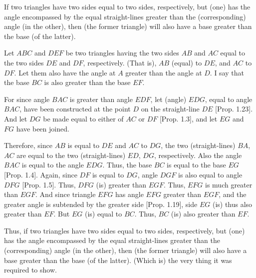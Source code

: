 \begin{Parallel}{}{}
{If two triangles have two sides equal to two sides, respectively,
but (one) has the angle encompassed by the equal straight-lines greater than the (corresponding)
angle (in the other), then (the former triangle) will also have a base greater than the base (of the latter).

\epsfysize=2in
\centerline{}

Let  $ABC$ and $DEF$ be two triangles having the two sides $AB$ and $AC$
equal to the two sides $DE$ and $DF$, respectively. (That is), $AB$ (equal) to $DE$, and
$AC$ to $DF$.  Let them also have the angle at $A$ greater than the angle at $D$.
I say that the base $BC$ is also greater than the base $EF$.

For since angle $BAC$ is greater than angle $EDF$, let (angle) $EDG$, equal to
angle $BAC$,  have been constructed at  the point $D$ on the straight-line $DE$ [Prop. 1.23]. And let $DG$ be made equal to either of $AC$ or $DF$ [Prop. 1.3], and let $EG$ and $FG$ have been joined.

Therefore, since $AB$ is equal to $DE$ and $AC$ to $DG$, the two (straight-lines)
$BA$, $AC$ are equal to the two (straight-lines) $ED$, $DG$, respectively.
Also the angle $BAC$ is equal to the angle $EDG$. Thus, the base $BC$ is equal
to the base $EG$ [Prop. 1.4]. Again, since $DF$ is equal to $DG$, angle $DGF$
is also equal to angle $DFG$ [Prop. 1.5]. Thus, $DFG$ (is) greater than $EGF$.
Thus, $EFG$ is much greater than $EGF$. And since triangle $EFG$ has angle $EFG$
greater than $EGF$, and the greater angle is subtended by the greater side [Prop. 1.19], side $EG$ (is) thus also greater than $EF$. But $EG$ (is) equal to
$BC$. Thus, $BC$ (is) also greater than $EF$.

Thus, if two triangles have two sides equal to two sides, respectively,
but (one) has the angle encompassed by the equal straight-lines greater than the 
(corresponding) angle (in the other), then (the former triangle) will also have a base greater than the base (of the latter).
(Which is) the very thing it was required to show.}
\end{Parallel}

